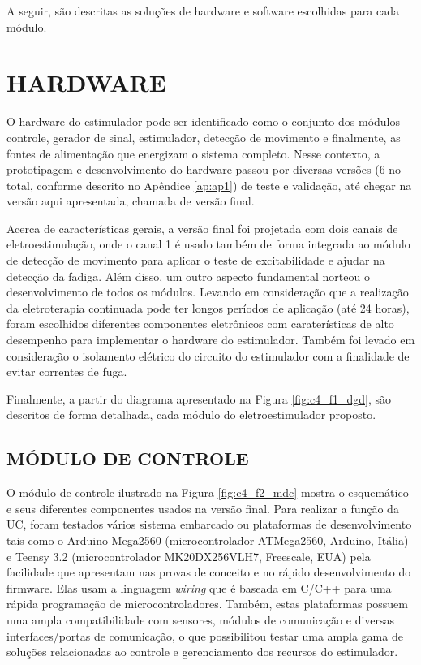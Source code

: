 A seguir, são descritas as soluções de hardware e software escolhidas para cada módulo.

\section{HARDWARE}
O hardware do estimulador pode ser identificado como o conjunto dos módulos controle, gerador de sinal, estimulador, detecção de movimento e finalmente, as fontes de alimentação que energizam o sistema completo. Nesse contexto, a prototipagem e desenvolvimento do hardware passou por diversas versões (6 no total, conforme descrito no Apêndice \ref{ap:ap1}) de teste e validação, até chegar na versão aqui apresentada, chamada de versão final. 

Acerca de características gerais, a versão final foi projetada com dois canais de eletroestimulação, onde o canal 1 é usado também de forma integrada ao módulo de detecção de movimento para aplicar o teste de excitabilidade e ajudar na detecção da fadiga. Além disso, um outro aspecto fundamental norteou o desenvolvimento de todos os módulos. Levando em consideração que a realização da eletroterapia continuada pode ter longos períodos de aplicação (até 24 horas), foram escolhidos diferentes componentes eletrônicos com caraterísticas de alto desempenho para implementar o hardware do estimulador. Também foi levado em consideração o isolamento elétrico do circuito do estimulador com a finalidade de evitar correntes de fuga.

Finalmente, a partir do diagrama apresentado na Figura \ref{fig:c4_f1_dgd}, são descritos de forma detalhada, cada módulo do eletroestimulador proposto.

\subsection{MÓDULO DE CONTROLE}
O módulo de controle ilustrado na Figura \ref{fig:c4_f2_mdc} mostra o esquemático e seus diferentes componentes usados na versão final. Para realizar a função da \acrshort{UC}, foram testados vários sistema embarcado ou plataformas de desenvolvimento tais como o Arduino Mega2560 (microcontrolador ATMega2560, Arduino, Itália) e Teensy 3.2 (microcontrolador MK20DX256VLH7, Freescale, EUA) pela facilidade que apresentam nas provas de conceito e no rápido desenvolvimento do firmware. Elas usam a linguagem \textit{wiring} que é baseada em C/C++ para uma rápida programação de microcontroladores. Também, estas plataformas possuem uma ampla compatibilidade com sensores, módulos de comunicação e diversas interfaces/portas de comunicação, o que possibilitou testar uma ampla gama de soluções relacionadas ao controle e gerenciamento dos recursos do estimulador.

